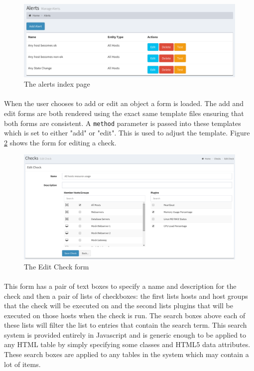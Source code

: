 \documentclass[bsc,logo,twoside]{infthesis}
\begin{document}
\begin{figure}[H]
	\caption{The alerts index page}
	\label{alerts-index}
	\includegraphics[scale=0.55]{assets/screenshots/alerts-index.pdf}
\end{figure}
	
\paragraph*{}
	When the user chooses to add or edit an object a form is loaded.  The add and
	edit forms are both rendered using the exact same template files ensuring that
	both forms are consistent.  A \texttt{method} parameter is passed into these
	templates which is set to either "add" or "edit".  This is used to adjust the
	template.  Figure \ref{edit-check} shows the form for editing a check.

\begin{figure}[H]
	\caption{The Edit Check form}
	\label{edit-check}
	\includegraphics[scale=0.45]{assets/screenshots/edit-check.pdf}
\end{figure}	

\paragraph*{}
	This form has a pair of text boxes to specify a name and description for the
	check and then a pair of lists of checkboxes: the first lists hosts and host
	groups that the check will be executed on and the second lists plugins that
	will be executed on those hosts when the check is run.  The search boxes above
	each of these lists will filter the list to entries that contain the search
	term. This search system is provided entirely in Javascript and is generic
	enough to be applied to any HTML table by simply specifying some classes and
	HTML5 data attributes.  These search boxes are applied to any tables in the
	system which may contain a lot of items.
	
\end{document}
